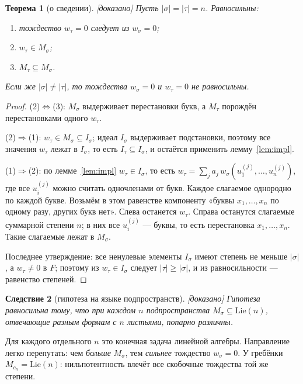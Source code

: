 \documentclass[11pt]{article}
\newcommand{\Lie}{\mathrm{Lie}}
\newcommand{\stat}[1]{\textsf{\small[#1]}}
\newcommand{\proved}{\stat{доказано}}
\theoremstyle{plain}
\newtheorem{theorem}{Теорема}
\newtheorem{corollary}[theorem]{Следствие}
\theoremstyle{definition}
\theoremstyle{remark}
\begin{document}
\begin{theorem}[о сведении]\label{thm:reduction} \proved{}
Пусть $|\sigma|=|\tau|=n$. Равносильны:
\begin{enumerate}[label=(\arabic*)]
\item тождество $w_\tau=0$ следует из $w_\sigma=0$;
\item $w_\tau\in M_\sigma$;
\item $M_\tau\subseteq M_\sigma$.
\end{enumerate}
Если же $|\sigma|\ne|\tau|$, то тождества $w_\sigma=0$ и $w_\tau=0$ не равносильны.
\end{theorem}
\begin{proof}
(2)$\Leftrightarrow$(3): $M_\sigma$ выдерживает перестановки букв, а $M_\tau$ порождён перестановками одного $w_\tau$.

(2)$\Rightarrow$(1): $w_\tau\in M_\sigma\subseteq I_\sigma$; идеал $I_\sigma$ выдерживает подстановки, поэтому все значения $w_\tau$ лежат в $I_\sigma$, то есть $I_\tau\subseteq I_\sigma$, и остаётся применить лемму~\ref{lem:impl}.

(1)$\Rightarrow$(2): по лемме~\ref{lem:impl} $w_\tau\in I_\sigma$, то есть $w_\tau=\sum_j a_j\,w_\sigma(u^{(j)}_1,\dots,u^{(j)}_n)$, где все $u^{(j)}_i$ можно считать одночленами от букв. Каждое слагаемое однородно по каждой букве. Возьмём в этом равенстве компоненту «буквы $x_1,\dots,x_n$ по одному разу, других букв нет». Слева останется $w_\tau$. Справа останутся слагаемые суммарной степени $n$; в них все $u^{(j)}_i$ --- буквы, то есть перестановка $x_1,\dots,x_n$. Такие слагаемые лежат в $M_\sigma$.

Последнее утверждение: все ненулевые элементы $I_\sigma$ имеют степень не меньше $|\sigma|$, а $w_\tau\ne0$ в $F$; поэтому из $w_\tau\in I_\sigma$ следует $|\tau|\ge|\sigma|$, и из равносильности --- равенство степеней.
\end{proof}

\begin{corollary}[гипотеза на языке подпространств] \proved{}
Гипотеза равносильна тому, что при каждом $n$ подпространства $M_\sigma\subseteq\Lie(n)$, отвечающие разным формам с $n$ листьями, попарно различны.
\end{corollary}

Для каждого отдельного $n$ это конечная задача линейной алгебры. Направление легко перепутать: чем \emph{больше} $M_\sigma$, тем \emph{сильнее} тождество $w_\sigma=0$. У гребёнки $M_{c_n}=\Lie(n)$: нильпотентность влечёт все скобочные тождества той же степени.
\end{document}
